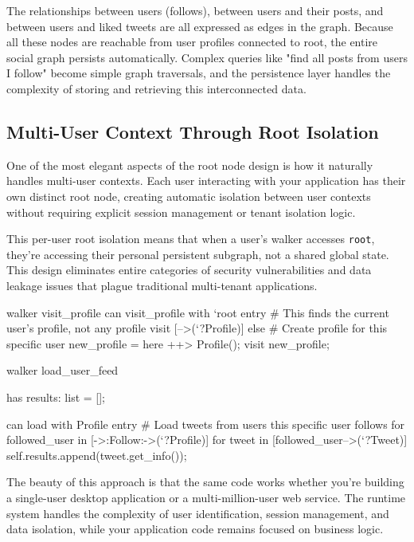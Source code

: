 The relationships between users (follows), between users and their posts, and between users and liked tweets are all expressed as edges in the graph. Because all these nodes are reachable from user profiles connected to root, the entire social graph persists automatically. Complex queries like "find all posts from users I follow" become simple graph traversals, and the persistence layer handles the complexity of storing and retrieving this interconnected data.

\subsection{Multi-User Context Through Root Isolation}

One of the most elegant aspects of the root node design is how it naturally handles multi-user contexts. Each user interacting with your application has their own distinct root node, creating automatic isolation between user contexts without requiring explicit session management or tenant isolation logic.

This per-user root isolation means that when a user's walker accesses \texttt{root}, they're accessing their personal persistent subgraph, not a shared global state. This design eliminates entire categories of security vulnerabilities and data leakage issues that plague traditional multi-tenant applications.

\begin{jacblock}
walker visit_profile {
    can visit_profile with `root entry {
        # This finds the current user's profile, not any profile
        visit [-->(`?Profile)] else {
            # Create profile for this specific user
            new_profile = here ++> Profile();
            visit new_profile;
        }
    }
}

walker load_user_feed {
    has results: list = [];

    can load with Profile entry {
        # Load tweets from users this specific user follows
        for followed_user in [->:Follow:->(`?Profile)] {
            for tweet in [followed_user-->(`?Tweet)] {
                self.results.append(tweet.get_info());
            }
        }
    }
}
\end{jacblock}

The beauty of this approach is that the same code works whether you're building a single-user desktop application or a multi-million-user web service. The runtime system handles the complexity of user identification, session management, and data isolation, while your application code remains focused on business logic.

